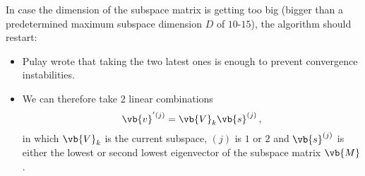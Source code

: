         In case the dimension of the subspace matrix is getting too big (bigger than a predetermined maximum subspace dimension $D$ of $10$-$15$), the algorithm should restart:
        \begin{itemize}
            \item Pulay wrote that taking the two latest ones is enough to prevent convergence instabilities.
            \item We can therefore take 2 linear combinations
                \begin{equation}
                    \vb{v}^{'(j)} = \vb{V}_k \vb{s}^{(j)} \thinspace ,
                \end{equation}
                in which $\vb{V}_k$ is the current subspace, $(j)$ is $1$ or $2$ and $\vb{s}^{(j)}$ is either the lowest or second lowest eigenvector of the subspace matrix $\vb{M}$.
        \end{itemize}

